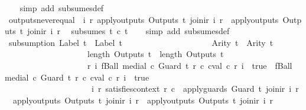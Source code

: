 \begin{isabellebody}
%
\isadelimproof
\ \ %
\endisadelimproof
%
\isatagproof
{}\isamarkupfalse%
\ {\isacharparenleft}simp\ add{\isacharcolon}\ subsumes{\isacharunderscore}def{\isacharparenright}%
\endisatagproof
{\isafoldproof}%
%
\isadelimproof
\isanewline
%
\endisadelimproof
\isanewline
{}\isamarkupfalse%
\ outputs{\isacharunderscore}never{\isacharunderscore}equal{\isacharcolon}\ {\isachardoublequoteopen}{\isasymnot}{\isacharparenleft}{\isasymexists}\ i\ r{\isachardot}\ apply{\isacharunderscore}outputs\ {\isacharparenleft}Outputs\ t{}{\isacharparenright}\ {\isacharparenleft}join{\isacharunderscore}ir\ i\ r{\isacharparenright}\ {\isacharequal}\ apply{\isacharunderscore}outputs\ {\isacharparenleft}Outputs\ t{}{\isacharparenright}\ {\isacharparenleft}join{\isacharunderscore}ir\ i\ r{\isacharparenright}{\isacharparenright}\ {\isasymLongrightarrow}\isanewline
{\isasymnot}\ subsumes\ t{}\ c\ t{}{\isachardoublequoteclose}\isanewline
%
\isadelimproof
\ \ %
\endisadelimproof
%
\isatagproof
{}\isamarkupfalse%
\ {\isacharparenleft}simp\ add{\isacharcolon}\ subsumes{\isacharunderscore}def{\isacharparenright}%
\endisatagproof
{\isafoldproof}%
%
\isadelimproof
\isanewline
%
\endisadelimproof
\isanewline
{}\isamarkupfalse%
\ subsumption{\isacharcolon}\ {\isachardoublequoteopen}Label\ t{}\ {\isacharequal}\ Label\ t{}\ {\isasymand}\isanewline
\ \ \ \ \ \ \ \ \ \ \ \ \ \ \ \ \ \ \ \ Arity\ t{}\ {\isacharequal}\ Arity\ t{}\ {\isasymand}\isanewline
\ \ \ \ \ \ \ \ \ \ \ \ \ \ \ \ \ \ \ \ length\ {\isacharparenleft}Outputs\ t{}{\isacharparenright}\ {\isacharequal}\ length\ {\isacharparenleft}Outputs\ t{}{\isacharparenright}\ {\isasymLongrightarrow}\isanewline
\ \ \ \ \ \ \ \ \ \ \ \ \ \ \ \ \ \ \ \ {\isacharparenleft}{\isasymforall}r\ i{\isachardot}\ fBall\ {\isacharparenleft}medial\ c\ {\isacharparenleft}Guard\ t{}{\isacharparenright}\ r{\isacharparenright}\ {\isacharparenleft}{\isasymlambda}c{\isachardot}\ cval\ c\ r\ i\ {\isacharequal}\ true{\isacharparenright}\ {\isasymlongrightarrow}\ fBall\ {\isacharparenleft}medial\ c\ {\isacharparenleft}Guard\ t{}{\isacharparenright}\ r{\isacharparenright}\ {\isacharparenleft}{\isasymlambda}c{\isachardot}\ cval\ c\ r\ i\ {\isacharequal}\ true{\isacharparenright}{\isacharparenright}\ {\isasymLongrightarrow}\isanewline
\ \ \ \ \ \ \ \ \ \ \ \ \ \ \ \ \ \ \ \ {\isacharparenleft}{\isasymforall}\ i\ r{\isachardot}\ satisfies{\isacharunderscore}context\ r\ c\ {\isasymlongrightarrow}\ apply{\isacharunderscore}guards\ {\isacharparenleft}Guard\ t{}{\isacharparenright}\ {\isacharparenleft}join{\isacharunderscore}ir\ i\ r{\isacharparenright}\ {\isasymlongrightarrow}\ apply{\isacharunderscore}outputs\ {\isacharparenleft}Outputs\ t{}{\isacharparenright}\ {\isacharparenleft}join{\isacharunderscore}ir\ i\ r{\isacharparenright}\ {\isacharequal}\ apply{\isacharunderscore}outputs\ {\isacharparenleft}Outputs\ t{}{\isacharparenright}\ {\isacharparenleft}join{\isacharunderscore}ir\ i\ r{\isacharparenright}{\isacharparenright}\ {\isasymLongrightarrow}\isanewline

\end{isabellebody}
